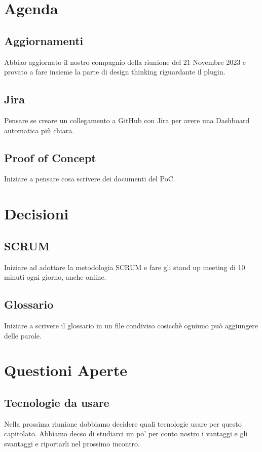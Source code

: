 \documentclass{article}
\begin{document}
\section{Agenda}
\subsection{Aggiornamenti}
 Abbiao aggiornato il nostro compagnio della riunione del 21 Novembre 2023 e provato a fare insieme la parte di design thinking riguardante il plugin.
\subsection{Jira}
Pensare se creare un collegamento a GitHub con Jira per avere una Dashboard automatica più chiara.
\subsection{Proof of Concept}
Iniziare a pensare cosa scrivere dei documenti del PoC.

\section{Decisioni}
    \subsection{SCRUM}
    Iniziare ad adottare la metodologia SCRUM e fare gli stand up meeting di 10 minuti ogni giorno, anche online. 
     \subsection{Glossario}
    Iniziare a scrivere il glossario in un file condiviso cosicchè ogniuno può aggiungere delle parole. 
\section{Questioni Aperte}
    \subsection{Tecnologie da usare}
    Nella prossima riunione dobbiamo decidere quali tecnologie usare per questo capitolato. Abbiamo decso di studiarci un po' per conto nostro i vantaggi e gli svantaggi e riportarli nel prossimo incontro.
\end{document}
